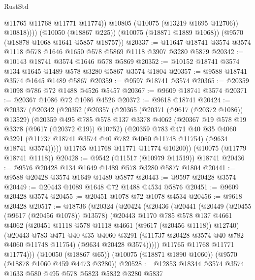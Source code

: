 \begin{lexlean}{RustStd}
\begin{coremodule}
                @11765
                @11768
                @11771
                @11774))
            @10805
            (@10075 (@13219 @1695 @12706))
            @10818))))
    (@10050 (@18867 @225))
    (@10075 (@18871 @1889 @1068))
    (@9570 (@18878 @1068 @1641 @5857 @18757))
@20337 := @11647 @18741 @3574 @3574 @1118 @578 @1646 @1650 @578 @5869 @1118 @3907 @3280 @5879
@20342 := @10143 @18741 @3574 @1646 @578 @5869
@20352 := @10152 @18741 @3574 @134 @1645 @1489 @578 @3280 @5867 @3574 @1804
@20357 := @9588 @18741 @3574 @1645 @1489 @5867
@20359 := @9597 @18741 @3574
@20365 := @20359 @1098 @786 @72 @1488 @4526 @5457
@20367 := @9609 @18741 @3574
@20371 := @20367 @1086 @72 @1086 @4526
@20372 := @9618 @18741
@20424 := @20337
    (@20342
      (@20352
        (@20357
          (@20365
            (@20371 (@9617 (@20372 @1086)) @13529)
            (@20359
              @495
              @785
              @578
              @137
              @3378
              @4062
              (@20367 @19 @578 @19 @3378 (@9617 (@20372 @19)) @10752)
              (@20359
                @783
                @471
                @40
                @35
                @4060
                @3291
                (@11737 @18741 @3574 @40 @782 @4060 @11748 @11754)
                (@9634 @18741 @3574)))))
        @11765
        @11768
        @11771
        @11774
        @10200))
    (@10075 (@11779 @18741 @1118))
@20428 := @9542 (@11517 (@10979 @11519)) @18741
@20436 := @9576 @20428 @134 @1649 @1489 @578 @3280 @5877 @1804
@20441 := @9588 @20428 @3574 @1649 @1489 @5877
@20443 := @9597 @20428 @3574
@20449 := @20443 @1089 @1648 @72 @1488 @4534 @5876
@20451 := @9609 @20428 @3574
@20455 := @20451 @1078 @72 @1078 @4534
@20456 := @9618 @20428
@20517 := @18736
    (@20324
      (@20424
        (@20436
          (@20441
            (@20449
              (@20455 (@9617 (@20456 @1078)) @13578)
              (@20443
                @1170
                @785
                @578
                @137
                @4661
                @4062
                (@20451 @1118 @578 @1118 @4661 (@9617 (@20456 @1118)) @12740)
                (@20443
                  @783
                  @471
                  @40
                  @35
                  @4060
                  @3291
                  (@11737 @20428 @3574 @40 @782 @4060 @11748 @11754)
                  (@9634 @20428 @3574)))))
          @11765
          @11768
          @11771
          @11774)))
    (@10050 (@18867 @65))
    (@10075 (@18871 @1890 @1060))
    (@9570 (@18878 @1060 @459 @4473 @3280))
@20528 := @12853 @18344 @3574 @3574 @1633 @580 @495 @578 @5823 @5832 @3280 @5837

\end{coremodule}
\end{lexlean}
